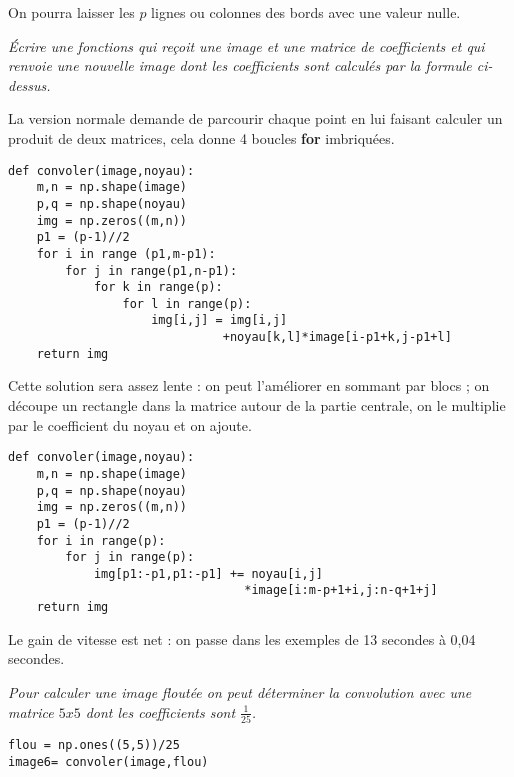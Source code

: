 On pourra laisser les $p$ lignes ou colonnes des bords avec une valeur nulle.
\begin{Exercise}[title=Convolution]\it Écrire une fonctions  qui reçoit une image et une matrice de coefficients et qui renvoie une nouvelle image dont les coefficients sont calculés par la formule ci-dessus.
\end{Exercise}
\begin{Answer} 
La version normale demande de parcourir chaque point en lui faisant calculer un produit de deux matrices, cela donne 4 boucles {\bf for} imbriquées.

\newpage

\begin{lstlisting}
def convoler(image,noyau):
    m,n = np.shape(image)
    p,q = np.shape(noyau) 
    img = np.zeros((m,n))
    p1 = (p-1)//2
    for i in range (p1,m-p1): 
        for j in range(p1,n-p1):
            for k in range(p):
                for l in range(p):
                    img[i,j] = img[i,j]
                              +noyau[k,l]*image[i-p1+k,j-p1+l]
    return img
\end{lstlisting}

Cette solution sera assez lente : on peut l'améliorer en sommant par blocs ; on découpe un rectangle dans la matrice autour de la partie centrale, on le multiplie par le coefficient du noyau et on ajoute.
\begin{lstlisting}
def convoler(image,noyau):
    m,n = np.shape(image)
    p,q = np.shape(noyau)
    img = np.zeros((m,n))
    p1 = (p-1)//2
    for i in range(p):
        for j in range(p):
            img[p1:-p1,p1:-p1] += noyau[i,j]
                                 *image[i:m-p+1+i,j:n-q+1+j]
    return img
\end{lstlisting}
Le gain de vitesse est net : on passe dans les exemples de 13 secondes à 0,04 secondes.
\end{Answer}
\begin{Exercise}[title=Floutage]\it Pour calculer une image floutée on peut déterminer la convolution avec une matrice 
$5x5$ dont les coefficients sont $\frac 1{25}$.
\end{Exercise}
\begin{Answer} 
\begin{lstlisting}
flou = np.ones((5,5))/25
image6= convoler(image,flou)
\end{lstlisting}
\end{Answer}
